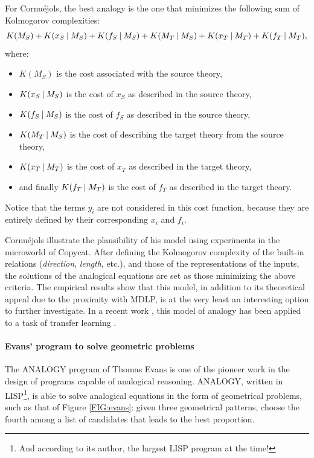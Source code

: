 For Cornuéjols, the best analogy is the one that minimizes the following sum of
Kolmogorov complexities:
$$K(M_S) + K(x_S \:\vert\: M_S) + K(f_S \:\vert\: M_S) + K(M_T \:\vert\: M_S) + K(x_T
\:\vert\: M_T) + K(f_T \:\vert\: M_T),$$
where:
\begin{itemize}
   \item $K(M_S)$ is the cost associated with the source theory,
   \item $K(x_S \:\vert\: M_S)$ is the cost of $x_S$ as described in the source
     theory,
   \item $K(f_S \:\vert\: M_S)$ is the cost of $f_S$ as described in the source
     theory,
   \item $K(M_T \:\vert\: M_S)$ is the cost of describing the target theory from
     the source theory,
   \item $K(x_T \:\vert\: M_T)$ is the cost of $x_T$ as described in the target
     theory,
   \item and finally $K(f_T \:\vert\: M_T)$ is the cost of $f_T$ as described in
     the target theory.
\end{itemize}

Notice that the terms $y_i$ are not considered in this cost function, because
they are entirely defined by their corresponding $x_i$ and $f_i$.

Cornuéjols illustrate the plausibility of his model using experiments in the
microworld of Copycat. After defining the Kolmogorov complexity of the built-in
relations (\textit{direction}, \textit{length}, etc.), and those of the
representations of the inputs, the solutions of the analogical equations are
set as those minimizing the above criteria. The empirical results show that
this model, in addition to its theoretical appeal due to the proximity with
MDLP, is at the very least an interesting option to further investigate. In a
recent work , this model of analogy has been applied to a task of transfer
learning \cite{CorMur16}.

\paragraph{Evans' program to solve geometric problems\\}

The ANALOGY program of Thomas Evans \cite{Eva64} is one of the pioneer work in
the design of programs capable of analogical reasoning. ANALOGY, written in
LISP\footnote{And according to its author, the largest LISP program at the
time!}, is able to solve analogical equations in the form of geometrical
problems, such as that of Figure \ref{FIG:evans}: given three geometrical
patterns, choose the fourth among a list of candidates that leads to the best
proportion.

